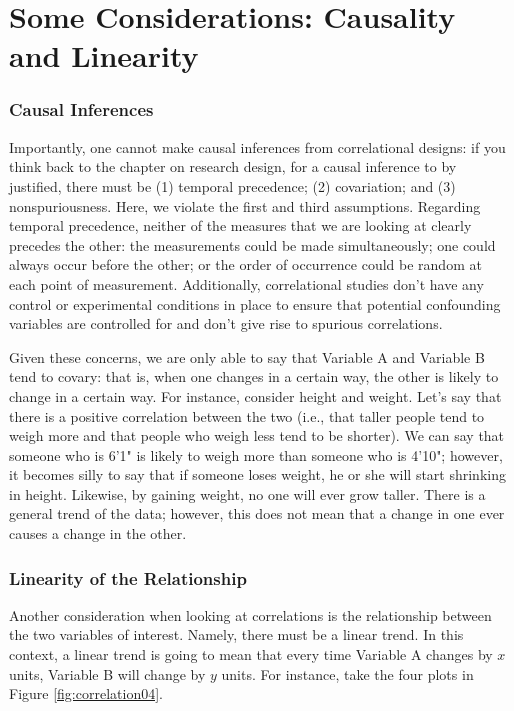 \section{Some Considerations: Causality and Linearity}
\subsubsection{Causal Inferences}
Importantly, one cannot make causal inferences from correlational designs: if you think back to the chapter on research design, for a causal inference to by justified, there must be (1) temporal precedence; (2) covariation; and (3) nonspuriousness. Here, we violate the first and third assumptions. Regarding temporal precedence, neither of the measures that we are looking at clearly precedes the other: the measurements could be made simultaneously; one could always occur before the other; or the order of occurrence could be random at each point of measurement. Additionally, correlational studies don't have any control or experimental conditions in place to ensure that potential confounding variables are controlled for and don't give rise to spurious correlations.

Given these concerns, we are only able to say that Variable A and Variable B tend to covary: that is, when one changes in a certain way, the other is likely to change in a certain way. For instance, consider height and weight. Let's say that there is a positive correlation between the two (i.e., that taller people tend to weigh more and that people who weigh less tend to be shorter). We can say that someone who is 6'1" is likely to weigh more than someone who is 4'10"; however, it becomes silly to say that if someone loses weight, he or she will start shrinking in height. Likewise, by gaining weight, no one will ever grow taller. There is a general trend of the data; however, this does not mean that a change in one ever causes a change in the other.

\subsubsection{Linearity of the Relationship}
Another consideration when looking at correlations is the relationship between the two variables of interest. Namely, there must be a linear trend. In this context, a linear trend is going to mean that every time Variable A changes by \( x \) units, Variable B will change by \(y\) units. For instance, take the four plots in Figure \ref{fig:correlation04}.

